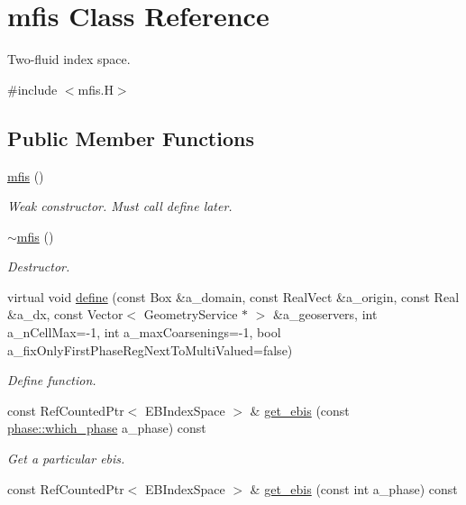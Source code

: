 \hypertarget{classmfis}{}\section{mfis Class Reference}
\label{classmfis}


Two-\/fluid index space.  




{\ttfamily \#include $<$mfis.\+H$>$}

\subsection*{Public Member Functions}
\begin{DoxyCompactItemize}
\item 
\hyperlink{classmfis_a5b4e7d53155c1f1064cd0ee5f51aba3e}{mfis} ()
\begin{DoxyCompactList}\small\item\em Weak constructor. Must call define later. \end{DoxyCompactList}\item 
\hyperlink{classmfis_a6b7710bd3761c281fa94d6d24a43e3c0}{$\sim$mfis} ()
\begin{DoxyCompactList}\small\item\em Destructor. \end{DoxyCompactList}\item 
virtual void \hyperlink{classmfis_a2ed1cd36b0747c70082430817403d28c}{define} (const Box \&a\+\_\+domain, const Real\+Vect \&a\+\_\+origin, const Real \&a\+\_\+dx, const Vector$<$ Geometry\+Service $\ast$ $>$ \&a\+\_\+geoservers, int a\+\_\+n\+Cell\+Max=-\/1, int a\+\_\+max\+Coarsenings=-\/1, bool a\+\_\+fix\+Only\+First\+Phase\+Reg\+Next\+To\+Multi\+Valued=false)
\begin{DoxyCompactList}\small\item\em Define function. \end{DoxyCompactList}\item 
const Ref\+Counted\+Ptr$<$ E\+B\+Index\+Space $>$ \& \hyperlink{classmfis_a2d7079c2d8e71a73d1e8e894f3d3efc7}{get\+\_\+ebis} (const \hyperlink{namespacephase_a23c76f548a5eb1955ed8c929c541108b}{phase\+::which\+\_\+phase} a\+\_\+phase) const 
\begin{DoxyCompactList}\small\item\em Get a particular ebis. \end{DoxyCompactList}\item 
const Ref\+Counted\+Ptr$<$ E\+B\+Index\+Space $>$ \& \hyperlink{classmfis_abddce4105d8507ce09fcc4703d30c53f}{get\+\_\+ebis} (const int a\+\_\+phase) const 

\end{DoxyCompactItemize}
